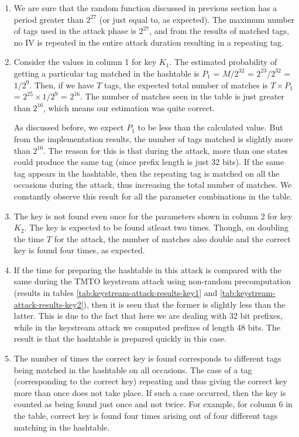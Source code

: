 \begin{enumerate}
\item We are sure that the random function discussed in previous section has a period greater than $2^{27}$ (or just equal to, as expected). The maximum number of tags used in the attack phase is $2^{27}$, and from the results of matched tags, no IV is repeated in the entire attack duration resulting in a repeating tag. 

\item Consider the values in column 1 for key $K_1$. The estimated probability of getting a particular tag matched in the hashtable is $P_1$ = $M/2^{32}$ = $2^{23}/2^{32}$ = $1/2^{9}$. Then, if we have $T$ tags, the expected total number of matches is $T \times P_1$ = $2^{25} \times 1/2^{9}$ = $2^{16}$. The number of matches seen in the table is just greater than $2^{16}$, which means our estimation was quite correct.
 
As discussed before, we expect $P_1$ to be less than the calculated value. But from the implementation results, the number of tags matched is slightly more than $2^{16}$. The reason for this is that during the attack, more than one states could produce the same tag (since prefix length is just 32 bits). If the same tag appears in the hashtable, then the repeating tag is matched on all the occasions during the attack, thus increasing the total number of matches. We constantly observe this result for all the parameter combinations in the table. 

\item The key is not found even once for the parameters shown in column 2 for key $K_2$. The key is expected to be found atleast two times. Though, on doubling the time $T$ for the attack, the number of matches also double and the correct key is found four times, as expected. 

\item If the time for preparing the hashtable in this attack is compared with the same during the TMTO keystream attack using non-random precomputation (results in tables \ref{tab:keystream-attack-results-key1} and \ref{tab:keystream-attack-results-key2}), then it is seen that the former is slightly less than the latter. This is due to the fact that here we are dealing with 32 bit prefixes, while in the keystream attack we computed prefixes of length 48 bits. The result is that the hashtable is prepared quickly in this case. 

\item The number of times the correct key is found corresponds to different tags being matched in the hashtable on all occasions. The case of a tag (corresponding to the correct key) repeating and thus giving the correct key more than once does not take place. If such a case occurred, then the key is counted as being found just once and not twice. For example, for column 6 in the table, correct key is found four times arising out of four different tags matching in the hashtable.
\end{enumerate}